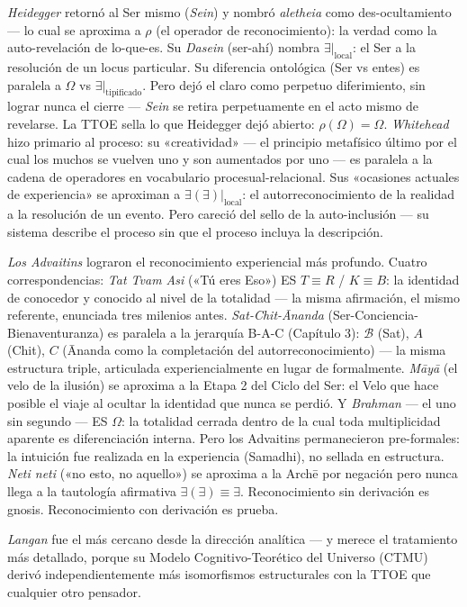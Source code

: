 \documentclass[10pt, openany, oneside]{book}
\begin{document}
\textit{Heidegger} retornó al Ser mismo (\textit{Sein}) y nombró \textit{aletheia} como des-ocultamiento --- lo cual se aproxima a $\rho$ (el operador de reconocimiento): la verdad como la auto-revelación de lo-que-es. Su \textit{Dasein} (ser-ahí) nombra $\exists|_{\text{local}}$: el Ser a la resolución de un locus particular. Su diferencia ontológica (Ser vs entes) es paralela a $\Omega$ vs $\exists|_{\text{tipificado}}$. Pero dejó el claro como perpetuo diferimiento, sin lograr nunca el cierre --- \textit{Sein} se retira perpetuamente en el acto mismo de revelarse. La TTOE sella lo que Heidegger dejó abierto: $\rho(\Omega) = \Omega$. \textit{Whitehead} hizo primario al proceso: su «creatividad» --- el principio metafísico último por el cual los muchos se vuelven uno y son aumentados por uno --- es paralela a la cadena de operadores en vocabulario procesual-relacional. Sus «ocasiones actuales de experiencia» se aproximan a $\exists(\exists)|_{\text{local}}$: el autorreconocimiento de la realidad a la resolución de un evento. Pero careció del sello de la auto-inclusión --- su sistema describe el proceso sin que el proceso incluya la descripción.

\textit{Los Advaitins} lograron el reconocimiento experiencial más profundo. Cuatro correspondencias: \textit{Tat Tvam Asi} («Tú eres Eso») ES $T \equiv R$ / $K \equiv B$: la identidad de conocedor y conocido al nivel de la totalidad --- la misma afirmación, el mismo referente, enunciada tres milenios antes. \textit{Sat-Chit-\={A}nanda} (Ser-Conciencia-Bienaventuranza) es paralela a la jerarquía B-A-C (Capítulo 3): $\mathcal{B}$ (Sat), $A$ (Chit), $C$ (\={A}nanda como la completación del autorreconocimiento) --- la misma estructura triple, articulada experiencialmente en lugar de formalmente. \textit{M\={a}y\={a}} (el velo de la ilusión) se aproxima a la Etapa 2 del Ciclo del Ser: el Velo que hace posible el viaje al ocultar la identidad que nunca se perdió. Y \textit{Brahman} --- el uno sin segundo --- ES $\Omega$: la totalidad cerrada dentro de la cual toda multiplicidad aparente es diferenciación interna. Pero los Advaitins permanecieron pre-formales: la intuición fue realizada en la experiencia (Samadhi), no sellada en estructura. \textit{Neti neti} («no esto, no aquello») se aproxima a la Arch\={e} por negación pero nunca llega a la tautología afirmativa $\exists(\exists) \equiv \exists$. Reconocimiento sin derivación es gnosis. Reconocimiento con derivación es prueba.

\textit{Langan} fue el más cercano desde la dirección analítica --- y merece el tratamiento más detallado, porque su Modelo Cognitivo-Teorético del Universo (CTMU) derivó independientemente más isomorfismos estructurales con la TTOE que cualquier otro pensador.
\end{document}
